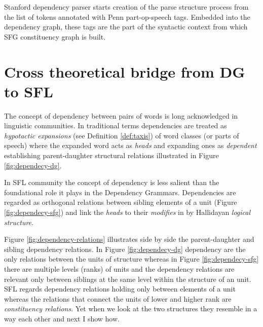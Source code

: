 Stanford dependency parser starts creation of the parse structure process from the list of tokens annotated with Penn part-op-speech tags. Embedded into the dependency graph, these tags are the part of the syntactic context from which SFG constituency graph is built. 



\section{Cross theoretical bridge from DG to SFL}
\label{sec:cross-theoretical-bridge}
\label{sec:dependecy-relations-sfl}

The concept of dependency between pairs of words is long acknowledged in linguistic communities. In traditional terms dependencies are treated as \textit{hypotactic expansions} (see Definition \ref{def:taxis}) of word classes (or parts of speech) where the expanded word acts as \textit{heads} and expanding ones as \textit{dependent} establishing parent-daughter structural relations illustrated in Figure \ref{fig:dependecy-dg}.




In SFL community the concept of dependency is less salient than the foundational role it plays in the Dependency Grammars. Dependencies are regarded as orthogonal relations between sibling elements of a unit (Figure \ref{fig:dependecy-sfg}) and link the \textit{heads} to their \textit{modifies} in by Hallidayan \textit{logical structure}\citep{Halliday2013}. 


Figure \ref{fig:dependency-relations} illustrates side by side the parent-daughter and sibling dependency relations. In Figure \ref{fig:dependecy-dg} dependency are the only relations between the units of structure whereas in Figure \ref{fig:dependecy-sfg} there are multiple levels (ranks) of units and the dependency relations are relevant only between siblings at the same level within the structure of an unit. SFL regards dependency relations holding only between elements of a unit whereas the relations that connect the units of lower and higher rank are \textit{constituency relations}. Yet when we look at the two structures they resemble in a way each other and next I show how. 

